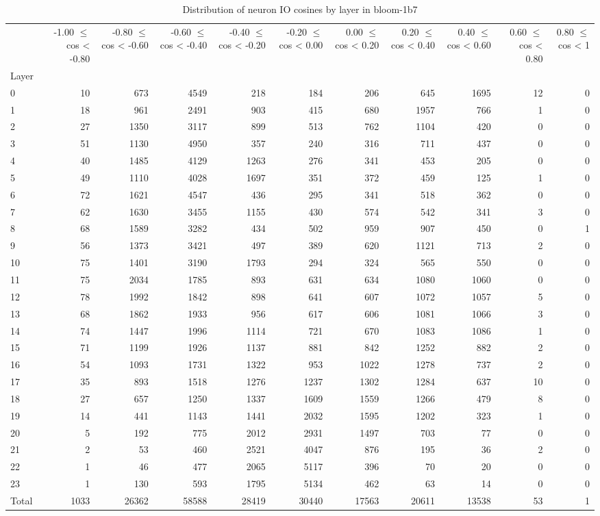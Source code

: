 \begin{table}
\caption{Distribution of neuron IO cosines by layer in bloom-1b7}
\label{tab:bloom-1b7_half_coarse}
\begin{tabular}{lrrrrrrrrrr}
 & -1.00 $\leq$ cos < -0.80 & -0.80 $\leq$ cos < -0.60 & -0.60 $\leq$ cos < -0.40 & -0.40 $\leq$ cos < -0.20 & -0.20 $\leq$ cos < 0.00 & 0.00 $\leq$ cos < 0.20 & 0.20 $\leq$ cos < 0.40 & 0.40 $\leq$ cos < 0.60 & 0.60 $\leq$ cos < 0.80 & 0.80 $\leq$ cos < 1 \\
Layer &  &  &  &  &  &  &  &  &  &  \\
0 & 10 & 673 & 4549 & 218 & 184 & 206 & 645 & 1695 & 12 & 0 \\
1 & 18 & 961 & 2491 & 903 & 415 & 680 & 1957 & 766 & 1 & 0 \\
2 & 27 & 1350 & 3117 & 899 & 513 & 762 & 1104 & 420 & 0 & 0 \\
3 & 51 & 1130 & 4950 & 357 & 240 & 316 & 711 & 437 & 0 & 0 \\
4 & 40 & 1485 & 4129 & 1263 & 276 & 341 & 453 & 205 & 0 & 0 \\
5 & 49 & 1110 & 4028 & 1697 & 351 & 372 & 459 & 125 & 1 & 0 \\
6 & 72 & 1621 & 4547 & 436 & 295 & 341 & 518 & 362 & 0 & 0 \\
7 & 62 & 1630 & 3455 & 1155 & 430 & 574 & 542 & 341 & 3 & 0 \\
8 & 68 & 1589 & 3282 & 434 & 502 & 959 & 907 & 450 & 0 & 1 \\
9 & 56 & 1373 & 3421 & 497 & 389 & 620 & 1121 & 713 & 2 & 0 \\
10 & 75 & 1401 & 3190 & 1793 & 294 & 324 & 565 & 550 & 0 & 0 \\
11 & 75 & 2034 & 1785 & 893 & 631 & 634 & 1080 & 1060 & 0 & 0 \\
12 & 78 & 1992 & 1842 & 898 & 641 & 607 & 1072 & 1057 & 5 & 0 \\
13 & 68 & 1862 & 1933 & 956 & 617 & 606 & 1081 & 1066 & 3 & 0 \\
14 & 74 & 1447 & 1996 & 1114 & 721 & 670 & 1083 & 1086 & 1 & 0 \\
15 & 71 & 1199 & 1926 & 1137 & 881 & 842 & 1252 & 882 & 2 & 0 \\
16 & 54 & 1093 & 1731 & 1322 & 953 & 1022 & 1278 & 737 & 2 & 0 \\
17 & 35 & 893 & 1518 & 1276 & 1237 & 1302 & 1284 & 637 & 10 & 0 \\
18 & 27 & 657 & 1250 & 1337 & 1609 & 1559 & 1266 & 479 & 8 & 0 \\
19 & 14 & 441 & 1143 & 1441 & 2032 & 1595 & 1202 & 323 & 1 & 0 \\
20 & 5 & 192 & 775 & 2012 & 2931 & 1497 & 703 & 77 & 0 & 0 \\
21 & 2 & 53 & 460 & 2521 & 4047 & 876 & 195 & 36 & 2 & 0 \\
22 & 1 & 46 & 477 & 2065 & 5117 & 396 & 70 & 20 & 0 & 0 \\
23 & 1 & 130 & 593 & 1795 & 5134 & 462 & 63 & 14 & 0 & 0 \\
Total & 1033 & 26362 & 58588 & 28419 & 30440 & 17563 & 20611 & 13538 & 53 & 1 \\
\end{tabular}
\end{table}
